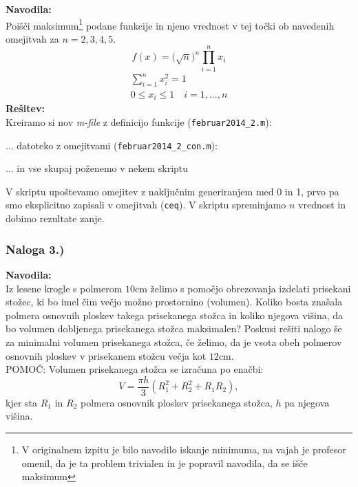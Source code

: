 \documentclass[a4paper,11pt]{article}
\begin{document}
\textbf{Navodila:} \\
Poišči maksimum\footnote{V originalnem izpitu je bilo navodilo iskanje minimuma, na vajah je profesor omenil, da je ta problem trivialen in je popravil navodila, da se išče maksimum} podane funkcije in njeno vrednost v tej točki ob navedenih omejitvah za $n=2,3,4,5$.
\begin{equation} 
f(x) = \big( \sqrt{n} \big)^{n} \prod_{i=1}^n x_i
\end{equation}
\begin{equation}
\begin{gathered}
	\sum_{i=1}^n x_i^2 = 1 \\
	0 \leq x_i \leq 1 \quad i=1, ..., n
\end{gathered}
\end{equation}
\textbf{Rešitev:} \\
Kreiramo si nov \textit{m-file} z definicijo funkcije (\texttt{februar2014\_2.m}):

... datoteko z omejitvami (\texttt{februar2014\_2\_con.m}):

... in vse skupaj poženemo v nekem skriptu

V skriptu upoštevamo omejitev z naključnim generiranjem med 0 in 1, prvo pa smo eksplicitno zapisali v omejitvah (\texttt{ceq}). V skriptu spreminjamo $n$ vrednost
in dobimo rezultate zanje.

\subsubsection{Naloga 3.)}

\textbf{Navodila:} \\
Iz lesene krogle s polmerom $10\si{\cm}$ želimo s pomočjo obrezovanja izdelati prisekani stožec, ki bo imel čim večjo možno prostornino (volumen). Koliko bosta znašala polmera osnovnih ploskev takega prisekanega stožca in koliko njegova višina, da bo volumen dobljenega prisekanega stožca maksimalen? Poskusi rešiti nalogo še za minimalni volumen prisekanega stožca, če želimo, da je vsota obeh polmerov osnovnih ploskev v prisekanem stožcu večja kot $12\si{\cm}$.\\
POMOČ: Volumen prisekanega stožca se izračuna po enačbi:
\begin{equation*}
V = \frac{\pi h}{3} \left( R_1^2 + R_2^2 + R_1R_2 \right),
\end{equation*}
kjer sta $R_1$ in $R_2$ polmera osnovnik ploskev prisekanega stožca, $h$ pa njegova višina.
\end{document}
